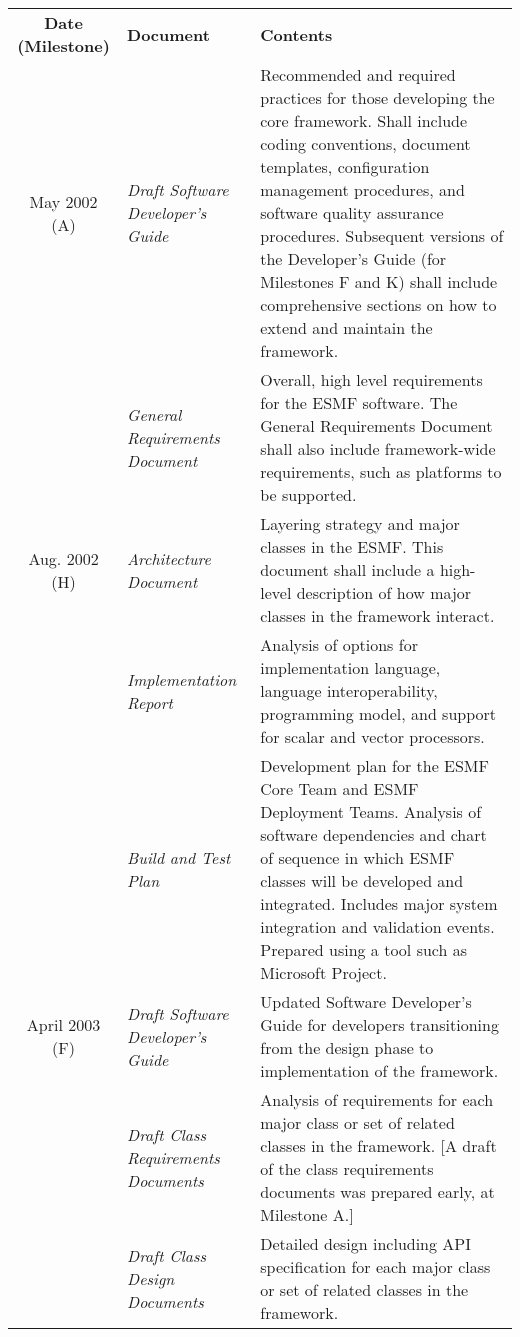 \begin{tabular}{c p{2in}p{3in}}
{\bf Date (Milestone)}  & {\bf Document} & {\bf Contents} \\ 
May 2002 (A) & 
{\it Draft Software Developer's Guide} &
Recommended and required practices for those developing the core 
framework.  Shall include coding conventions, document templates,
configuration management procedures, and software quality assurance 
procedures. Subsequent versions of the Developer's Guide (for Milestones 
F and K) shall include comprehensive sections on how to extend and
maintain the framework.\\

  & {\it General Requirements Document} &
Overall, high level requirements for the ESMF software. The General
Requirements Document shall also include framework-wide requirements,
such as platforms to be supported.  \\

Aug. 2002 (H) & {\it Architecture Document} &
Layering strategy and major classes in the ESMF.  This document shall 
include a high-level description of how major classes in the framework
interact. \\

  & {\it Implementation Report} &
Analysis of options for implementation language, language interoperability, 
programming model, and support for scalar and vector processors. \\

  & {\it Build and Test Plan} &
Development plan for the ESMF Core Team and ESMF Deployment Teams.  
Analysis of software dependencies and chart of sequence 
in which ESMF classes will be developed and integrated.  Includes 
major system integration and validation events.  Prepared using 
a tool such as Microsoft Project. \\

April 2003 (F) & {\it Draft Software Developer's Guide} &
Updated Software Developer's Guide for developers transitioning from 
the design phase to implementation of the framework. \\

  & {\it Draft Class Requirements Documents} &
Analysis of requirements for each major class or set of related 
classes in the framework. [A draft of the class requirements 
documents was prepared early, at Milestone A.]\\

  & {\it Draft Class Design Documents} &
Detailed design including API specification for each 
major class or set of related classes in the framework. \\


\end{tabular}
